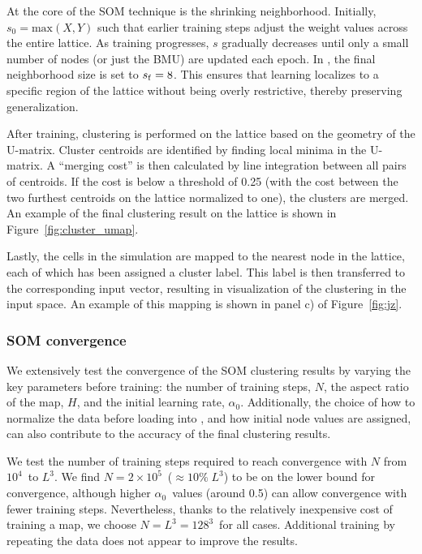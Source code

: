 At the core of the SOM technique is the shrinking neighborhood.
Initially, $s_0 = \mathrm{max}(X,Y)$ such that earlier training steps adjust the weight values across the entire lattice.
As training progresses, $s$ gradually decreases until only a small number of nodes (or just the BMU) are updated each epoch.
In \awesom, the final neighborhood size is set to $s_{\rm f} = 8$.
This ensures that learning localizes to a specific region of the lattice without being overly restrictive, thereby preserving generalization.

After training, clustering is performed on the lattice based on the geometry of the U-matrix.
Cluster centroids are identified by finding local minima in the U-matrix.
A ``merging cost'' is then calculated by line integration between all pairs of centroids.
If the cost is below a threshold of 0.25 (with the cost between the two furthest centroids on the lattice normalized to one), the clusters are merged.
An example of the final clustering result on the lattice is shown in Figure~\ref{fig:cluster_umap}.

Lastly, the cells in the simulation are mapped to the nearest node in the lattice, each of which has been assigned a cluster label.
This label is then transferred to the corresponding input vector, resulting in visualization of the clustering in the input space.
An example of this mapping is shown in panel c) of Figure~\ref{fig:jz}.


\subsubsection{SOM convergence}\label{app:convergence}
We extensively test the convergence of the SOM clustering results by varying the key parameters before training: the number of training steps, $N$, the aspect ratio of the map, $H$, and the initial learning rate, $\alpha_0$.
Additionally, the choice of how to normalize the data before loading into \awesom, and how initial node values are assigned, can also contribute to the accuracy of the final clustering results.

We test the number of training steps required to reach convergence with $N$ from $10^4$~to $L^3$.
We find $N = 2\times10^5$~($\approx 10\% \; L^3$) to be on the lower bound for convergence, although higher $\alpha_0$~values (around 0.5) can allow convergence with fewer training steps.
Nevertheless, thanks to the relatively inexpensive cost of training a map, we choose $N=L^3=128^3$~for all cases.
Additional training by repeating the data does not appear to improve the results.

